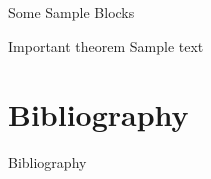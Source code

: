 \documentclass[10pt, aspectratio=169]{beamer}
\newcommand{\cpsh}[2][]{\textsuperscript{\fontsize{6}{6}\textcolor{mzescyan}{[{#1}\citealp[]{#2}]}}}
\newcommand{\cpsl}[2][]{\textsubscript{\fontsize{6}{6}\textcolor{mzescyan}{[{#1}\citealp[]{#2}]}}}
\newcommand{\csh}[2][]{\textsuperscript{\fontsize{6}{6}\textcolor{mzescyan}{[{#1}\citealp[]{#2};}}}
\newcommand{\csl}[2]{\textsubscript{\fontsize{6}{6}\textcolor{mzescyan}{\hphantom{[{#2}}\citealp{#1}]}}}
\newcommand{\cpshl}[3][]{\textcolor{mzescyan}{\rlap{\csh[#1]{#2}}{\csl{#3}{#1}}}}
\begin{document}
{\begin{frame}{Some Sample Blocks}
		\begin{alertblock}{Important theorem}
			Sample text
		\end{alertblock}
	\end{frame}
	
	
	
	
	
	\section{Bibliography}
	\begin{frame}[allowframebreaks]{Bibliography}
	\printbibliography[heading=none]
	\end{frame}
}
\end{document}
